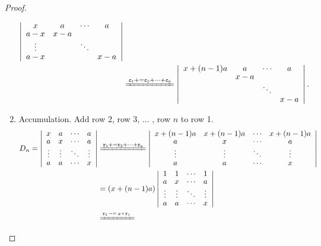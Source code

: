 \documentclass{report}
\theoremstyle{nonumberplain}
\newtheorem{proof}{Proof.}
\newcommand{\pluseq}{\mathrel{{+}{=}}}
\newcommand{\minuseq}{\mathrel{{-}{=}}}
\newcommand\scalemath[2]{\scalebox{#1}{\mbox{\ensuremath{\displaystyle #2}}}}
\begin{document}
\begin{proof}
\begin{enumerate}
\begin{equation*}
\begin{aligned}
				\left|\begin{array}{cccc}
					x & a & \cdots & a \\
					a-x & x-a &  &  \\
					\vdots &  & \ddots &  \\
					a-x & &  & x-a
				\end{array}\right|\\
				&\xlongequal{\mathtt{c_1\pluseq c_2+\cdots+c_n}}\left|\begin{array}{cccc}
					x+(n-1)a & a & \cdots & a \\
					& x-a &  &  \\
					 &  & \ddots &  \\
					 & &  & x-a
				\end{array}\right|.
			\end{aligned}
		\end{equation*}
		\item Accumulation. Add row 2, row 3, ... , row $n$ to row 1.
		\begin{equation*}		
			\begin{aligned}
			D_{n}=\left|\begin{array}{cccc}
				x & a & \cdots & a \\
				a & x & \cdots & a \\
				\vdots & \vdots & \ddots & \vdots \\
				a & a & \cdots & x
			\end{array}\right|&\xlongequal{\mathtt{r_1\pluseq r_2+\cdots+r_n}}
			\left|\begin{array}{cccc}
				x+(n-1)a & x+(n-1)a & \cdots & x+(n-1)a  \\
				a & x & \cdots & a \\
				\vdots & \vdots & \ddots & \vdots \\
				a & a & \cdots & x
			\end{array}\right|\\
			&=\left(x+(n-1)a\right)\left|\begin{array}{cccc}
				1 & 1 & \cdots & 1 \\
				a & x & \cdots & a \\
				\vdots & \vdots & \ddots & \vdots \\
				a & a & \cdots & x
			\end{array}\right|\\
			&\xlongequal{\scalemath{0.65}{\arraycolsep=1.4pt\def\arraystretch{0.85}
				\begin{array}{l}
					\mathtt{r_2\minuseq \mathit{a}* r_1}\\

\end{array}}}
\end{aligned}
\end{equation*}
\end{enumerate}
\end{proof}
\end{document}

